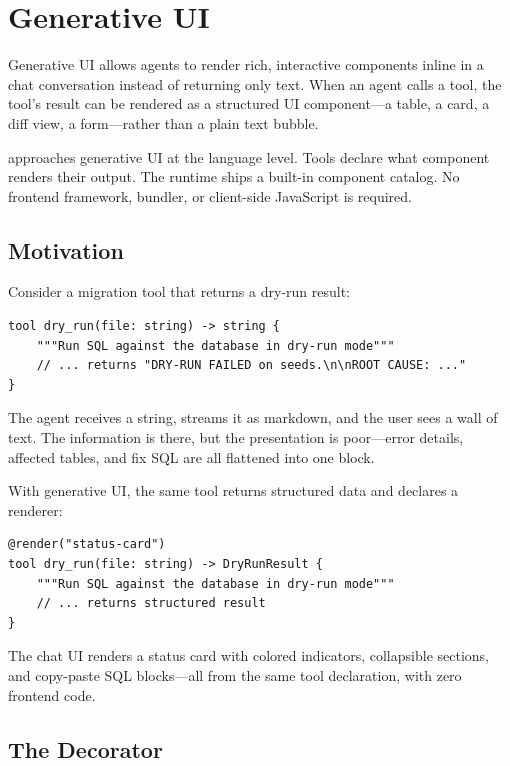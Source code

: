 \chapter{Generative UI}
\label{ch:generative-ui}

Generative UI allows agents to render rich, interactive components inline in a chat conversation instead of returning only text. When an agent calls a tool, the tool's result can be rendered as a structured UI component---a table, a card, a diff view, a form---rather than a plain text bubble.

\haira{} approaches generative UI at the language level. Tools declare what component renders their output. The runtime ships a built-in component catalog. No frontend framework, bundler, or client-side JavaScript is required.

\section{Motivation}

Consider a migration tool that returns a dry-run result:

\begin{lstlisting}
tool dry_run(file: string) -> string {
    """Run SQL against the database in dry-run mode"""
    // ... returns "DRY-RUN FAILED on seeds.\n\nROOT CAUSE: ..."
}
\end{lstlisting}

The agent receives a string, streams it as markdown, and the user sees a wall of text. The information is there, but the presentation is poor---error details, affected tables, and fix SQL are all flattened into one block.

With generative UI, the same tool returns structured data and declares a renderer:

\begin{lstlisting}
@render("status-card")
tool dry_run(file: string) -> DryRunResult {
    """Run SQL against the database in dry-run mode"""
    // ... returns structured result
}
\end{lstlisting}

The chat UI renders a status card with colored indicators, collapsible sections, and copy-paste SQL blocks---all from the same tool declaration, with zero frontend code.

\section{The  Decorator}

